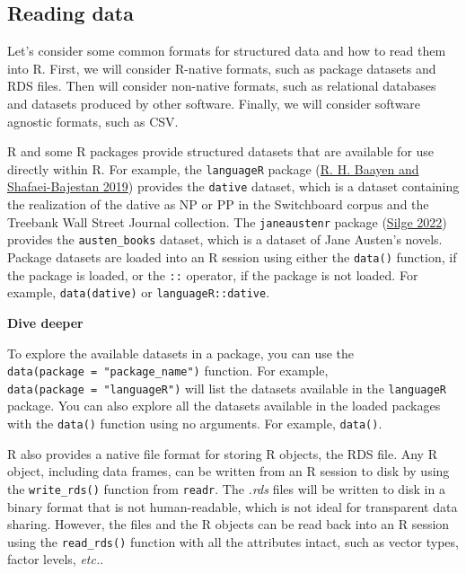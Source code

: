 \documentclass[
  letterpaper,
  DIV=11,
  numbers=noendperiod]{scrreport}
\theoremstyle{definition}
\theoremstyle{remark}
\begin{document}
\hypertarget{reading-data-1}{%
\subsection{Reading data}\label{reading-data-1}}

Let's consider some common formats for structured data and how to read
them into R. First, we will consider R-native formats, such as package
datasets and RDS files. Then will consider non-native formats, such as
relational databases and datasets produced by other software. Finally,
we will consider software agnostic formats, such as CSV.

R and some R packages provide structured datasets that are available for
use directly within R. For example, the \texttt{languageR} package
(\protect\hyperlink{ref-R-languageR}{R. H. Baayen and Shafaei-Bajestan
2019}) provides the \texttt{dative} dataset, which is a dataset
containing the realization of the dative as NP or PP in the Switchboard
corpus and the Treebank Wall Street Journal collection. The
\texttt{janeaustenr} package
(\protect\hyperlink{ref-R-janeaustenr}{Silge 2022}) provides the
\texttt{austen\_books} dataset, which is a dataset of Jane Austen's
novels. Package datasets are loaded into an R session using either the
\texttt{data()} function, if the package is loaded, or the \texttt{::}
operator, if the package is not loaded. For example,
\texttt{data(dative)} or \texttt{languageR::dative}.

\begin{tcolorbox}[enhanced jigsaw, opacityback=0, bottomrule=.15mm, left=2mm, breakable, colback=white, leftrule=.75mm, toprule=.15mm, rightrule=.15mm, arc=.35mm]

\textbf{ Dive deeper}

To explore the available datasets in a package, you can use the
\texttt{data(package\ =\ "package\_name")} function. For example,
\texttt{data(package\ =\ "languageR")} will list the datasets available
in the \texttt{languageR} package. You can also explore all the datasets
available in the loaded packages with the \texttt{data()} function using
no arguments. For example, \texttt{data()}.

\end{tcolorbox}

R also provides a native file format for storing R objects, the RDS
file. Any R object, including data frames, can be written from an R
session to disk by using the \texttt{write\_rds()} function from
\texttt{readr}. The \emph{.rds} files will be written to disk in a
binary format that is not human-readable, which is not ideal for
transparent data sharing. However, the files and the R objects can be
read back into an R session using the \texttt{read\_rds()} function with
all the attributes intact, such as vector types, factor levels,
\emph{etc.}.
\end{document}
